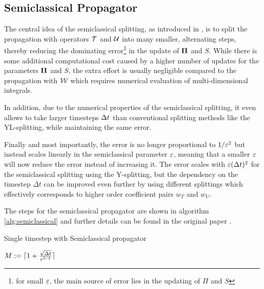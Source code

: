 \subsection{Semiclassical Propagator}
\label{sub:semiclassical_propagator}
%
The central idea of the semiclassical splitting, as introduced in \cite{GH_convsemiclassical},
is to split the propagation with operators $\mathcal{T}$ and $\mathcal{U}$ into many smaller, alternating steps, thereby reducing the dominating error\footnote{for small $\varepsilon$,
the main source of error lies in the updating of $\Pi$ and $S$} in the update of $\bm{\Pi}$ and $S$.
While there is some additional computational cost caused by a higher number of updates for the parameters $\bm{\Pi}$ and $S$, the extra effort is usually negligible compared to the propagation with $\mathcal{W}$ which requires numerical evaluation of multi-dimensional integrals. 
\par\medskip
%
In addition, due to the numerical properties of the semiclassical splitting, 
it even allows to take larger timesteps $\Delta t$ than conventional
splitting methods like the YL-splitting, while maintaining the same error.
\par\medskip
%
Finally and most importantly, the error is no longer proportional to $1/\varepsilon^2$ but instead
scales linearly in the semiclassical parameter $\varepsilon$,
meaning that a smaller $\varepsilon$ will now reduce the error instead of increasing it.
The error scales with $\varepsilon (\Delta t)^2$ for the semiclassical splitting using the Y-splitting,
but the dependency on the timestep $\Delta t$ can be improved even further by using different
splittings which effectively corresponds to higher order coefficient pairs $w_T$ and $w_U$.
\par\medskip
%
The steps for the semiclassical propagator are shown in algorithm \ref{alg:semiclassical} and 
further details can be found in the original paper \cite{GH_convsemiclassical}.
%
\begin{algorithm}[h]
	\caption{Single timestep with Semiclassical propagator}
	\label{alg:semiclassical}
	\begin{algorithmic}
	\State
		\State
		\State $M := \lceil 1 + \frac{\sqrt{\Delta t}}{\varepsilon^{3/4}} \rceil$
		\State
		\State {}
		\State {}
		\State {}
		\State
	\EndProcedure
	\end{algorithmic}
\end{algorithm}


